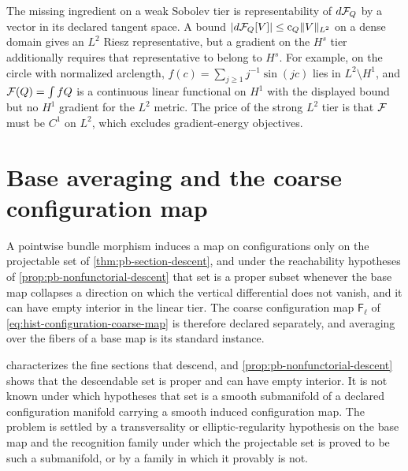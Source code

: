 The missing ingredient on a weak Sobolev tier is representability of \(d\mathcal F_Q\)
by a vector in its declared tangent space. A bound
\(|d\mathcal F_Q[V]|\leq\mathrm c_Q\|V\|_{L^2}\) on a dense domain gives an \(L^2\)
Riesz representative, but a gradient on the \(H^s\) tier additionally requires that
representative to belong to \(H^s\). For example, on the circle with normalized
arclength, \(f(c)=\sum_{j\geq1}j^{-1}\sin(jc)\) lies in \(L^2\setminus H^1\), and
\(\mathcal F(Q)=\int fQ\) is a continuous linear functional on \(H^1\) with the displayed
bound but no \(H^1\) gradient for the \(L^2\) metric. The price of the strong \(L^2\)
tier is that \(\mathcal F\) must be \(C^1\) on \(L^2\), which excludes gradient-energy
objectives.

\section{Base averaging and the coarse configuration map}
\label{sec:hist-base-averaging}

A pointwise bundle morphism induces a map on configurations only on the
projectable set of \cref{thm:pb-section-descent}, and under the reachability
hypotheses of \cref{prop:pb-nonfunctorial-descent} that set is a proper subset
whenever the base map collapses a direction on which the vertical differential
does not vanish, and it can have empty interior in the linear tier. The coarse
configuration map \(\mathsf F_\ell\) of \eqref{eq:hist-configuration-coarse-map}
is therefore declared separately, and averaging over the fibers of a base map is
its standard instance.

 characterizes the fine sections that descend, and
\cref{prop:pb-nonfunctorial-descent} shows that the descendable set is proper and
can have empty interior. It is not known under which hypotheses that set is a
smooth submanifold of a declared configuration manifold carrying a smooth
induced configuration map. The problem is settled by a transversality or
elliptic-regularity hypothesis on the base map and the recognition family under
which the projectable set is proved to be such a submanifold, or by a family in
which it provably is not.

